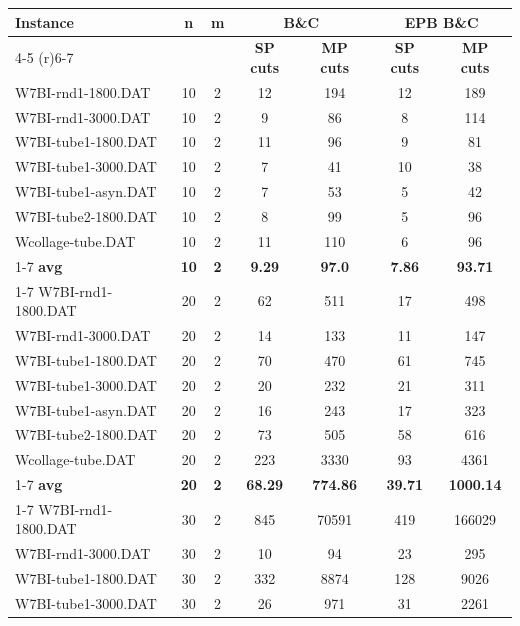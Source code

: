 \begin{table}[!ht]
\centering
\hspace*{-1cm}\begin{tabular}{lcccccc}
\toprule
\textbf{Instance} & \textbf{n} & \textbf{m} & \multicolumn{2}{c}{\textbf{B\&C}}  & \multicolumn{2}{c}{\textbf{EPB B\&C}}
\\
\cmidrule(r){4-5} \cmidrule(r){6-7} 
~ & ~ & ~ & \textbf{SP cuts} &\textbf{MP cuts} & \textbf{SP cuts} &\textbf{MP cuts} \\
\midrule

W7BI-rnd1-1800.DAT & 10 & 2 & 12 & 194 & 12 & 189 \\
W7BI-rnd1-3000.DAT & 10 & 2 & 9 & 86 & 8 & 114 \\
W7BI-tube1-1800.DAT & 10 & 2 & 11 & 96 & 9 & 81 \\
W7BI-tube1-3000.DAT & 10 & 2 & 7 & 41 & 10 & 38 \\
W7BI-tube1-asyn.DAT & 10 & 2 & 7 & 53 & 5 & 42 \\
W7BI-tube2-1800.DAT & 10 & 2 & 8 & 99 & 5 & 96 \\
Wcollage-tube.DAT & 10 & 2 & 11 & 110 & 6 & 96 \\
\cline{1-7} \textbf{avg} & \textbf{10} & \textbf{2} & \textbf{9.29} & \textbf{97.0} & \textbf{7.86} & \textbf{93.71} \\ \cline{1-7}
W7BI-rnd1-1800.DAT & 20 & 2 & 62 & 511 & 17 & 498 \\
W7BI-rnd1-3000.DAT & 20 & 2 & 14 & 133 & 11 & 147 \\
W7BI-tube1-1800.DAT & 20 & 2 & 70 & 470 & 61 & 745 \\
W7BI-tube1-3000.DAT & 20 & 2 & 20 & 232 & 21 & 311 \\
W7BI-tube1-asyn.DAT & 20 & 2 & 16 & 243 & 17 & 323 \\
W7BI-tube2-1800.DAT & 20 & 2 & 73 & 505 & 58 & 616 \\
Wcollage-tube.DAT & 20 & 2 & 223 & 3330 & 93 & 4361 \\
\cline{1-7} \textbf{avg} & \textbf{20} & \textbf{2} & \textbf{68.29} & \textbf{774.86} & \textbf{39.71} & \textbf{1000.14} \\ \cline{1-7}
W7BI-rnd1-1800.DAT & 30 & 2 & 845 & 70591 & 419 & 166029 \\
W7BI-rnd1-3000.DAT & 30 & 2 & 10 & 94 & 23 & 295 \\
W7BI-tube1-1800.DAT & 30 & 2 & 332 & 8874 & 128 & 9026 \\
W7BI-tube1-3000.DAT & 30 & 2 & 26 & 971 & 31 & 2261 \\

\end{tabular}
\end{table}
